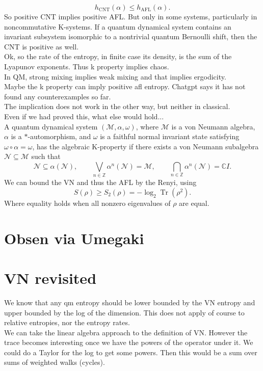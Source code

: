 \documentclass{article}
\begin{document}
\[
    h_{\mathrm{CNT}}(\alpha)\leq h_{\mathrm{AFL}}(\alpha).
\]
So positive CNT implies positive AFL. But only in some systems, particularly in noncommutative K-systems. If a quantum dynamical system contains an invariant subsystem isomorphic to a nontrivial quantum Bernoulli shift, then the CNT is positive as well. \\
Ok, so the rate of the entropy, in finite case its density, is the sum of the Lyapunov exponents. Thus k property implies chaos. \\
In QM, strong mixing implies weak mixing and that implies ergodicity. \\
Maybe the k property can imply positive afl entropy. Chatgpt says it has not found any counterexamples so far. \\
The implication does not work in the other way, but neither in classical. \\
Even if we had proved this, what else would hold...\\
A quantum dynamical system $(\mathcal M,\alpha,\omega)$, where $\mathcal M$ is a von Neumann algebra, $\alpha$ is a $*$-automorphism, and $\omega$ is a faithful normal invariant state satisfying $\omega\circ\alpha=\omega$, has the algebraic K-property if there exists a von Neumann subalgebra $\mathcal N\subseteq\mathcal M$ such that
\[
\mathcal N\subseteq\alpha(\mathcal N),\qquad \bigvee_{n\in\mathbb Z}\alpha^n(\mathcal N)=\mathcal M,\qquad \bigcap_{n\in\mathbb Z}\alpha^n(\mathcal N)=\mathbb CI.
\]
We can bound the VN and thus the AFL by the Renyi, using
\[
    S(\rho)\geq S_2(\rho)=-\log_2\operatorname{Tr}(\rho^2).
\]
Where equality holds when all nonzero eigenvalues of $\rho$ are equal. \\
\section{Obsen via Umegaki}

\section{VN revisited}
We know that any qm entropy should be lower bounded by the VN entropy and upper bounded by the log of the dimension. This does not apply of course to relative entropies, nor the entropy rates.  \\
We can take the linear algebra approach to the definition of VN. However the trace becomes interesting once we have the powers of the operator under it. We could do a Taylor for the log to get some powers. Then this would be a sum over sums of weighted walks (cycles). 
\end{document}
